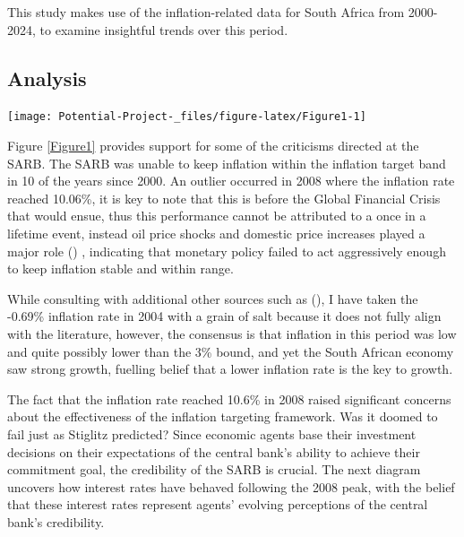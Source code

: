 \documentclass[11pt,preprint]{elsarticle}
\let\origfigure\figure
\let\endorigfigure\endfigure
\renewenvironment{figure}[1][2] {
    \expandafter\origfigure\expandafter[H]
} {
    \endorigfigure
}
\numberwithin{equation}{section}
\numberwithin{figure}{section}
\numberwithin{table}{section}
\begin{document}
This study makes use of the inflation-related data for South Africa from
2000-2024, to examine insightful trends over this period.

\subsection{Analysis}\label{analysis}

\begin{figure}[H]

{\centering \texttt{[image: Potential-Project-\_files/figure-latex/Figure1-1]} 

}

\caption{ \label{Figure1}}\label{fig:Figure1}
\end{figure}

Figure \ref{Figure1} provides support for some of the criticisms
directed at the SARB. The SARB was unable to keep inflation within the
inflation target band in 10 of the years since 2000. An outlier occurred
in 2008 where the inflation rate reached 10.06\%, it is key to note that
this is before the Global Financial Crisis that would ensue, thus this
performance cannot be attributed to a once in a lifetime event, instead
oil price shocks and domestic price increases played a major role
() , indicating
that monetary policy failed to act aggressively enough to keep inflation
stable and within range.

While consulting with additional other sources such as
(), I have
taken the -0.69\% inflation rate in 2004 with a grain of salt because it
does not fully align with the literature, however, the consensus is that
inflation in this period was low and quite possibly lower than the 3\%
bound, and yet the South African economy saw strong growth, fuelling
belief that a lower inflation rate is the key to growth.

The fact that the inflation rate reached 10.6\% in 2008 raised
significant concerns about the effectiveness of the inflation targeting
framework. Was it doomed to fail just as Stiglitz predicted? Since
economic agents base their investment decisions on their expectations of
the central bank's ability to achieve their commitment goal, the
credibility of the SARB is crucial. The next diagram uncovers how
interest rates have behaved following the 2008 peak, with the belief
that these interest rates represent agents' evolving perceptions of the
central bank's credibility.
\end{document}
